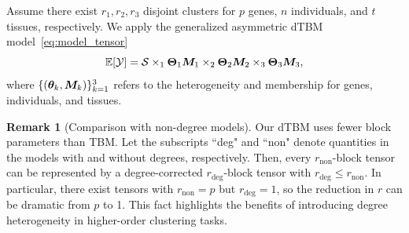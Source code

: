 \documentclass[lettersize,onecolumn,journal]{IEEEtran}
\theoremstyle{definition}
\theoremstyle{definition}
\newtheorem{example}{Example}
\newtheorem{rmk}{Remark}
\begin{document}
{Assume there exist $r_1, r_2, r_3$ disjoint clusters for $p$ genes, $n$ individuals, and $t$ tissues, respectively. We apply the generalized asymmetric dTBM model~\eqref{eq:model_tensor} 
\begin{equation}
    \mathbb{E}[\mathcal{Y}] = \mathcal{S} \times_1 \boldsymbol{\Theta}_1 \bm M_1 \times_2 \boldsymbol{\Theta}_2 \bm M_2 \times_3 \boldsymbol{\Theta}_3 \bm M_3, 
\end{equation}
where $\{(\boldsymbol{\theta}_k, \bm M_k)\}_{k=1}^3$ refers to the heterogeneity and membership for genes, individuals, and tissues. 




}


\begin{rmk}[Comparison with non-degree models]
Our dTBM uses fewer block parameters than TBM. Let the subscripts ``deg" and ``non" denote quantities in the models with and without degrees, respectively. Then, every $r_{\text{non}}$-block tensor can be represented by a degree-corrected $r_{\text{deg}}$-block tensor with $r_{\text{deg}}\leq r_{\text{non}}$. In particular, there exist tensors with $r_{\text{non}}=p$ but $r_{\text{deg}}=1$, so the reduction in $r$ can be dramatic from $p$ to 1. This fact highlights the benefits of introducing degree heterogeneity in higher-order clustering tasks.
\end{rmk}
\end{document}

